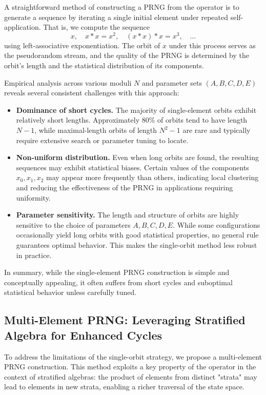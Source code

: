 \documentclass[12pt]{article}
\theoremstyle{definition}
\theoremstyle{plain}
\theoremstyle{remark}
\begin{document}
A straightforward method of constructing a PRNG from the operator is to generate a sequence by iterating a single initial element under repeated self-application. That is, we compute the sequence
\[
x,\quad x * x = x^2,\quad (x * x) * x = x^3,\quad \dots
\]
using left-associative exponentiation. The orbit of \( x \) under this process serves as the pseudorandom stream, and the quality of the PRNG is determined by the orbit’s length and the statistical distribution of its components.

Empirical analysis across various moduli \( N \) and parameter sets \( (A, B, C, D, E) \) reveals several consistent challenges with this approach:

\begin{itemize}
    \item \textbf{Dominance of short cycles.} The majority of single-element orbits exhibit relatively short lengths. Approximately 80\% of orbits tend to have length \( N - 1 \), while maximal-length orbits of length \( N^2 - 1 \) are rare and typically require extensive search or parameter tuning to locate.

    \item \textbf{Non-uniform distribution.} Even when long orbits are found, the resulting sequences may exhibit statistical biases. Certain values of the components \( x_0, x_1, x_2 \) may appear more frequently than others, indicating local clustering and reducing the effectiveness of the PRNG in applications requiring uniformity.

    \item \textbf{Parameter sensitivity.} The length and structure of orbits are highly sensitive to the choice of parameters \( A, B, C, D, E \). While some configurations occasionally yield long orbits with good statistical properties, no general rule guarantees optimal behavior. This makes the single-orbit method less robust in practice.
\end{itemize}

In summary, while the single-element PRNG construction is simple and conceptually appealing, it often suffers from short cycles and suboptimal statistical behavior unless carefully tuned.

\subsection{Multi-Element PRNG: Leveraging Stratified Algebra for Enhanced Cycles}

To address the limitations of the single-orbit strategy, we propose a multi-element PRNG construction. This method exploits a key property of the operator in the context of stratified algebras: the product of elements from distinct "strata" may lead to elements in new strata, enabling a richer traversal of the state space.
\end{document}
